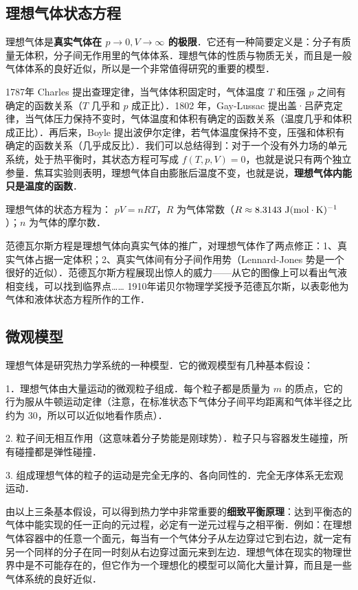 
\subsection{理想气体状态方程}

理想气体是\textbf{真实气体在 $p\rightarrow 0,V\rightarrow \infty$ 的极限}．它还有一种简要定义是：分子有质量无体积，分子间无作用里的气体体系．理想气体的性质与物质无关，而且是一般气体体系的良好近似，所以是一个非常值得研究的重要的模型．

1787年 Charles 提出查理定律，当气体体积固定时，气体温度 $T$ 和压强 $p$ 之间有确定的函数关系（$T$ 几乎和 $p$ 成正比）．1802 年，Gay-Lussac 提出盖·吕萨克定律，当气体压力保持不变时，气体温度和体积有确定的函数关系（温度几乎和体积成正比）．再后来，Boyle 提出波伊尔定律，若气体温度保持不变，压强和体积有确定的函数关系（几乎成反比）．我们可以总结得到：对于一个没有外力场的单元系统，处于热平衡时，其状态方程可写成 $f(T,p,V)=0$，也就是说只有两个独立参量．焦耳实验则表明，理想气体自由膨胀后温度不变，也就是说，\textbf{理想气体内能只是温度的函数}．

理想气体的状态方程为： $pV=nRT$，$R$ 为气体常数（$R\approx 8.3143\ \rm{J}(\rm{mol\cdot K})^{-1}$）；$n$ 为气体的摩尔数．

范德瓦尔斯方程是理想气体向真实气体的推广，对理想气体作了两点修正：1、真实气体占据一定体积；2、真实气体间有分子间作用势（Lennard-Jones 势是一个很好的近似）．范德瓦尔斯方程展现出惊人的威力——从它的图像上可以看出气液相变线，可以找到临界点…… 1910年诺贝尔物理学奖授予范德瓦尔斯，以表彰他为气体和液体状态方程所作的工作．

\subsection{微观模型}

理想气体是研究热力学系统的一种模型．它的微观模型有几种基本假设：

1．理想气体由大量运动的微观粒子组成．每个粒子都是质量为 $m$ 的质点，它的行为服从牛顿运动定律（注意，在标准状态下气体分子间平均距离和气体半径之比约为 $30$，所以可以近似地看作质点）．

2. 粒子间无相互作用（这意味着分子势能是刚球势）．粒子只与容器发生碰撞，所有碰撞都是弹性碰撞．

3. 组成理想气体的粒子的运动是完全无序的、各向同性的．完全无序体系无宏观运动．

由以上三条基本假设，可以得到热力学中非常重要的\textbf{细致平衡原理}：达到平衡态的气体中能实现的任一正向的元过程，必定有一逆元过程与之相平衡．例如：在理想气体容器中的任意一个面元，每当有一个气体分子从左边穿过它到右边，就一定有另一个同样的分子在同一时刻从右边穿过面元来到左边．理想气体在现实的物理世界中是不可能存在的，但它作为一个理想化的模型可以简化大量计算，而且是一些气体系统的良好近似．